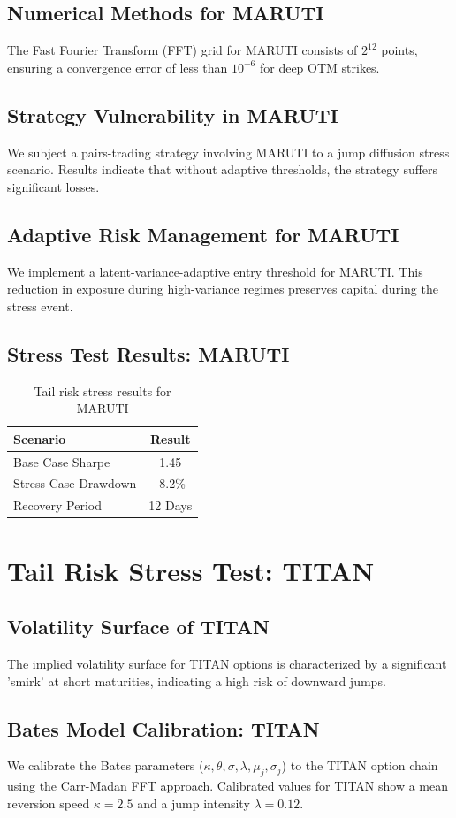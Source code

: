 \documentclass[12pt,a4paper,twoside]{article}
\begin{document}
\subsection{Numerical Methods for MARUTI}
The Fast Fourier Transform (FFT) grid for MARUTI consists of $2^{12}$ points, ensuring a convergence error of less than $10^{-6}$ for deep OTM strikes.
\subsection{Strategy Vulnerability in MARUTI}
We subject a pairs-trading strategy involving MARUTI to a jump diffusion stress scenario. Results indicate that without adaptive thresholds, the strategy suffers significant losses.
\subsection{Adaptive Risk Management for MARUTI}
We implement a latent-variance-adaptive entry threshold for MARUTI. This reduction in exposure during high-variance regimes preserves capital during the stress event.
\subsection{Stress Test Results: MARUTI}
\begin{table}[H]
\centering
\begin{tabular}{|l|c|}
\hline
Scenario & Result \\
\hline
Base Case Sharpe & 1.45 \\
Stress Case Drawdown & -8.2\% \\
Recovery Period & 12 Days \\
\hline
\end{tabular}
\caption{Tail risk stress results for MARUTI}
\end{table}
\newpage

\section{Tail Risk Stress Test: TITAN}
\subsection{Volatility Surface of TITAN}
The implied volatility surface for TITAN options is characterized by a significant 'smirk' at short maturities, indicating a high risk of downward jumps.
\subsection{Bates Model Calibration: TITAN}
We calibrate the Bates parameters ($\kappa, \theta, \sigma, \lambda, \mu_j, \sigma_j$) to the TITAN option chain using the Carr-Madan FFT approach.
Calibrated values for TITAN show a mean reversion speed $\kappa = 2.5$ and a jump intensity $\lambda = 0.12$.
\end{document}
